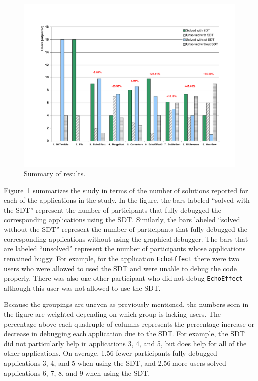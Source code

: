 \documentclass[11pt, letterpaper, onecolumn]{article}
\begin{document}
\begin{figure}[t]
\begin{center}
  \includegraphics[scale=.5, angle=0]{./users-results.pdf}
  \caption{Summary of results.}
  \label{fig:solutions}
\end{center}
\end{figure}

Figure~\ref{fig:solutions} summarizes the study in terms of the number
of solutions  reported for each of  the applications in  the study. In
the figure,  the bars  labeled ``solved with  the SDT''  represent the
number   of  participants  that   fully  debugged   the  corresponding
applications  using  the SDT.  Similarly,  the  bars labeled  ``solved
without  the SDT''  represent the  number of  participants  that fully
debugged  the corresponding applications  without using  the graphical
debugger. The bars that  are labeled ``unsolved'' represent the number
of participants  whose applications  remained buggy. For  example, for
the application \texttt{EchoEffect} there were two users who were
allowed to used the SDT and were unable to debug the code
properly. There was also one other participant who did not debug
\texttt{EchoEffect} although this user was not allowed to use the SDT.

Because the groupings are  uneven as previously mentioned, the numbers
seen in  the figure are weighted  depending on which  group is lacking
users. The  percentage above each quadruple of  columns represents the
percentage increase  or decrease in  debugging each application  due to
the  SDT.   For  example,  the   SDT  did  not  particularly  help  in
applications  3,  4,  and 5,  but  does  help  for  all of  the  other
applications.   On  average, 1.56  fewer  participants fully  debugged
applications  3, 4,  and 5  when using  the SDT,  and 2.56  more users
solved applications  6, 7,  8, and  9 when using  the SDT.
\end{document}
